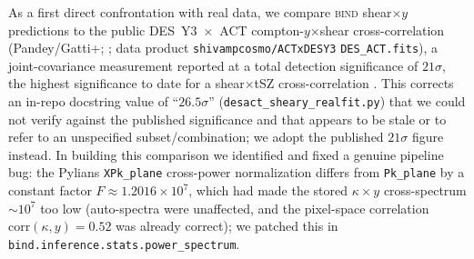 \documentclass[11pt]{article}
\newcommand{\bind}{\textsc{bind}}
\newcommand{\kappay}{\kappa\times y}
\begin{document}
As a first direct confrontation with real data, we compare \bind{}
shear$\times y$ predictions to the public DES~Y3~$\times$~ACT
compton-$y$$\times$shear cross-correlation (Pandey/Gatti+;
\citealp{Gatti2021DESACT,Pandey2022DESACT}; data product
\texttt{shivampcosmo/ACTxDESY3} \texttt{DES\_ACT.fits}), a joint-covariance
measurement reported at a total detection significance of $21\sigma$, the
highest significance to date for a shear$\times$tSZ cross-correlation
\citep{Gatti2021DESACT}. This corrects an in-repo docstring value of
``$26.5\sigma$'' (\texttt{desact\_sheary\_realfit.py}) that we could not
verify against the published significance and that appears to be stale or
to refer to an unspecified subset/combination; we adopt the published
$21\sigma$ figure instead. %
In building this comparison we identified and fixed a genuine pipeline
bug: the Pylians \texttt{XPk\_plane} cross-power normalization differs
from \texttt{Pk\_plane} by a constant factor $F\approx1.2016\times10^7$,
which had made the stored $\kappay$ cross-spectrum $\sim\!10^7$ too low
(auto-spectra were unaffected, and the pixel-space correlation
$\mathrm{corr}(\kappa,y)=0.52$ was already correct); we patched this in
\texttt{bind.inference.stats.power\_spectrum}. %
\end{document}
